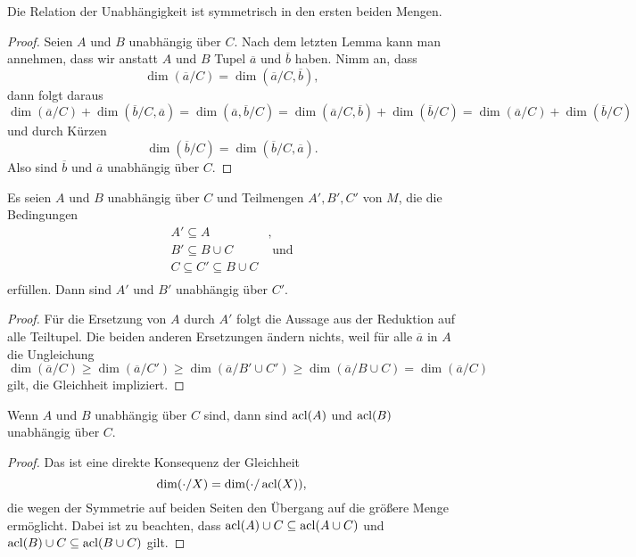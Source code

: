 \begin{lemma}
	Die Relation der Unabhängigkeit ist symmetrisch in den ersten beiden Mengen.
\end{lemma}
\begin{proof}
	Seien $A$ und $B$ unabhängig über $C$. Nach dem letzten Lemma kann man annehmen, dass wir anstatt $A$ und $B$ Tupel $\overline{a}$ und $\overline{b}$ haben. Nimm an, dass $$\dim(\overline{a}/C)=\dim(\overline{a}/C,\overline{b}),$$
	dann folgt daraus $$\dim(\overline{a}/C)+\dim(\overline{b}/C,\overline{a})=\dim(\overline{a},\overline{b}/C)=\dim(\overline{a}/C,\overline{b})+\dim(\overline{b}/C)=\dim(\overline{a}/C)+\dim(\overline{b}/C)$$ und durch Kürzen $$\dim(\overline{b}/C)=\dim(\overline{b}/C,\overline{a}).$$
	Also sind $\overline{b}$ und $\overline{a}$ unabhängig über $C$.
\end{proof}
\newpage
\begin{lemma}\label{Unabhängigkeit Teilmenge}
	Es seien $A$ und $B$ unabhängig über $C$ und Teilmengen $A',B',C'$ von $M$, die die Bedingungen
	\begin{align*}
	A'\subseteq A&,\\B'\subseteq B\cup C&\text{ und}\\C\subseteq C'\subseteq B\cup C&\\
	\end{align*}
	erfüllen. Dann sind $A'$ und $B'$ unabhängig über $C'$.
\end{lemma}
\begin{proof}
	Für die Ersetzung von $A$ durch $A'$ folgt die Aussage aus der Reduktion auf alle Teiltupel. Die beiden anderen Ersetzungen ändern nichts, weil für alle $\overline{a}$ in $A$ die Ungleichung
	$$\dim(\overline{a}/C)\geq\dim(\overline{a}/C')\geq\dim(\overline{a}/B'\cup C')\geq\dim(\overline{a}/B\cup C)=\dim(\overline{a}/C)$$ gilt, die Gleichheit impliziert.
\end{proof}

\begin{lemma}\label{Unabhängigkeit acl}
	Wenn $A$ und $B$ unabhängig über $C$ sind, dann sind $\operatorname{acl}(A)$ und $\operatorname{acl}(B)$ unabhängig über $C$.
\end{lemma}
\begin{proof}
	Das ist eine direkte Konsequenz der Gleichheit $$\dim(\cdot/X)=\dim(\cdot/\operatorname{acl}(X)),$$ die wegen der Symmetrie auf beiden Seiten den Übergang auf die größere Menge ermöglicht. Dabei ist zu beachten, dass $\operatorname{acl}(A)\cup C\subseteq\operatorname{acl}(A\cup C)$ und $\operatorname{acl}(B)\cup C\subseteq\operatorname{acl}(B\cup C)$ gilt.
\end{proof}

